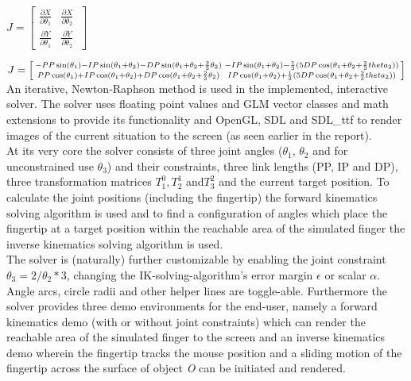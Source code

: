 \documentclass{article}
\begin{document}
\(J= \begin{bmatrix}
\frac{\partial X}{\partial \theta_1} & \frac{\partial X}{\partial \theta_2} \\
\frac{\partial Y}{\partial \theta_1} & \frac{\partial Y}{\partial \theta_2} \
\end{bmatrix}\)

\(J =\\\\ \begin{bsmallmatrix}
-PP\sin(\theta_1) - IP\sin(\theta_1 + \theta_2) - DP\sin(\theta_1 + \theta_2 + \frac{2}{3}\theta_2)
& -IP\sin(\theta_1 + \theta_2) - \frac{1}{3}(5DP\cos(\theta_1 + \theta_2 + \frac{2}{3}theta_2))
\\PP\cos(\theta_1) + IP\cos(\theta_1 + \theta_2) + DP\cos(\theta_1 + \theta_2 + \frac{2}{3}\theta_2)
& IP\cos(\theta_1 + \theta_2) + \frac{1}{3}(5DP\cos(\theta_1 + \theta_2 + \frac{2}{3}theta_2))
\\
\end{bsmallmatrix} \)\\

An iterative, Newton-Raphson method is used in the implemented, interactive solver. The solver uses floating point values and GLM vector classes and math extensions to provide its functionality and OpenGL, SDL and SDL\_ttf to render images of the current situation to the screen (as seen earlier in the report).\\

At its very core the solver consists of three joint angles (\(\theta_1\), \(\theta_2\) and for unconstrained use \(\theta_3\)) and their constraints, three link lengths (PP, IP and DP), three  transformation matrices \(T_1^0, T_2^1\) and\( T_3^2\) and the current target position. To calculate the joint positions (including the fingertip) the forward kinematics solving algorithm is used and to find a configuration of angles which place the fingertip at a target position within the reachable area of the simulated finger the inverse kinematics solving algorithm is used.\\

The solver is (naturally) further customizable by enabling the joint constraint \(\theta_3 = 2 / \theta_2 * 3\), changing the IK-solving-algorithm's error margin \(\epsilon\) or scalar \(\alpha\). Angle arcs, circle radii and other helper lines are toggle-able. Furthermore the solver provides three demo environments for the end-user, namely a forward kinematics demo (with or without joint constraints) which can render the reachable area of the simulated finger to the screen and an inverse kinematics demo wherein the fingertip tracks the mouse position and a sliding motion of the fingertip across the surface of object \textit{O} can be initiated and rendered.\\
\end{document}
